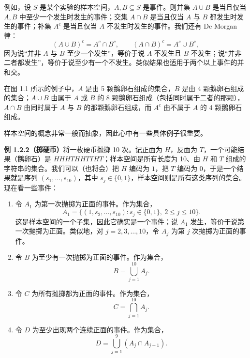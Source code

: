\documentclass[UTF8,12pt,a4paper,fontset=fandol]{ctexart}
\begin{document}
例如，设 $S$ 是某个实验的样本空间，$A,B\subseteq S$ 是事件。则并集 $A\cup B$ 是当且仅当 $A,B$ 中至少一个发生时发生的事件；交集 $A\cap B$ 是当且仅当 $A$ 与 $B$ 都发生时发生的事件；补集 $A^c$ 是当且仅当 $A$ 不发生时发生的事件。我们还有 De Morgan 律：
\[
  (A\cup B)^c=A^c\cap B^c,\qquad (A\cap B)^c=A^c\cup B^c,
\]
因为说“并非 $A$ 与 $B$ 至少一个发生”，等价于说 $A$ 不发生且 $B$ 不发生；说“并非二者都发生”，等价于说至少有一个不发生。类似结果也适用于两个以上事件的并和交。

在图 1.1 所示的例子中，$A$ 是由 5 颗鹅卵石组成的集合，$B$ 是由 4 颗鹅卵石组成的集合；$A\cup B$ 由属于 $A$ 或 $B$ 的 8 颗鹅卵石组成（包括同时属于二者的那颗），$A\cap B$ 由同时属于 $A$ 与 $B$ 的那颗鹅卵石组成，而 $A^c$ 由不属于 $A$ 的 4 颗鹅卵石组成。

样本空间的概念非常一般而抽象，因此心中有一些具体例子很重要。

\noindent\textbf{例 1.2.2（掷硬币）}\quad 将一枚硬币抛掷 10 次。记正面为 $H$，反面为 $T$，一个可能结果（鹅卵石）是 $HHHTHHTTHT$；样本空间是所有长度为 10、由 $H$ 和 $T$ 组成的字符串的集合。我们可以（也将会）把 $H$ 编码为 $1$，把 $T$ 编码为 $0$，于是一个结果就是序列 $(s_1,\ldots,s_{10})$，其中 $s_j\in\{0,1\}$，样本空间则是所有这类序列的集合。现在看一些事件：

\begin{enumerate}
  \item 令 $A_1$ 为第一次抛掷为正面的事件。作为集合，
  \[
    A_1=\{(1,s_2,\ldots,s_{10}):s_j\in\{0,1\},\ 2\le j\le 10\}.
  \]
  这是样本空间的一个子集，因此它确实是一个事件；说 $A_1$ 发生，等价于说第一次抛掷为正面。类似地，对 $j=2,3,\ldots,10$，令 $A_j$ 为第 $j$ 次抛掷为正面的事件。

  \item 令 $B$ 为至少有一次抛掷为正面的事件。作为集合，
  \[
    B=\bigcup_{j=1}^{10} A_j.
  \]

  \item 令 $C$ 为所有抛掷都为正面的事件。作为集合，
  \[
    C=\bigcap_{j=1}^{10} A_j.
  \]

  \item 令 $D$ 为至少出现两个连续正面的事件。作为集合，
  \[
    D=\bigcup_{j=1}^{9}(A_j\cap A_{j+1}).
  \]
\end{enumerate}
\end{document}
